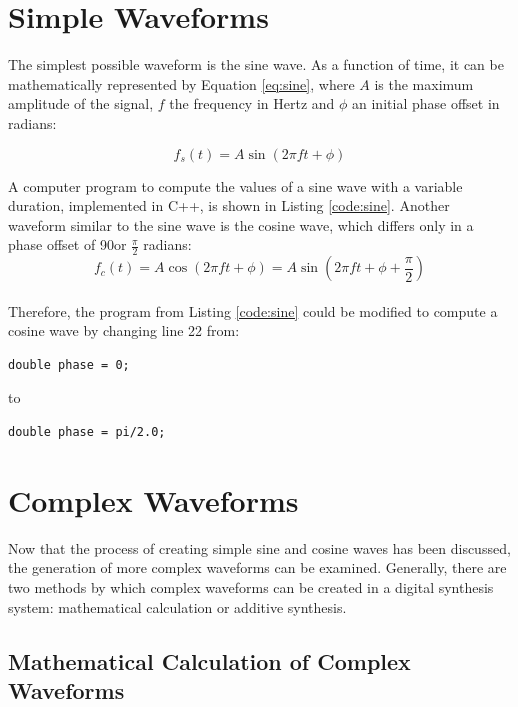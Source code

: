 \documentclass[12pt,twoside]{report}
\begin{document}
\section{Simple Waveforms}

The simplest possible waveform is the sine wave. As a function of time, it can be mathematically represented by Equation \ref{eq:sine}, where $A$ is the maximum amplitude of the signal, $f$ the frequency in Hertz and $\phi$ an initial phase offset in radians:

\begin{equation}
  f_{s}(t) = A \sin(2 \pi  f t + \phi)
  \label{eq:sine}
\end{equation}

A computer program to compute the values of a sine wave with a variable duration, implemented in C++, is shown in Listing \ref{code:sine}. Another waveform similar to the sine wave is the cosine wave, which differs only in a phase offset of 90\degree or $\frac{\pi}{2}$ radians:\\
\begin{equation}
  f_{c}(t) = A \cos(2 \pi  f t + \phi) = A \sin(2 \pi f t + \phi + \frac{\pi}{2})
  \label{eq:cosine}
\end{equation}\\
Therefore, the program from Listing \ref{code:sine} could be modified to compute a cosine wave by changing line 22 from:\\

\begin{lstlisting}[firstnumber=22]
  double phase = 0;
\end{lstlisting}
to
\begin{lstlisting}[firstnumber=22]
  double phase = pi/2.0;
\end{lstlisting}

\section{Complex Waveforms}

Now that the process of creating simple sine and cosine waves has been discussed, the generation of more complex waveforms can be examined. Generally, there are two methods by which complex waveforms can be created in a digital synthesis system: mathematical calculation or additive synthesis.

\subsection{Mathematical Calculation of Complex Waveforms}
\end{document}
